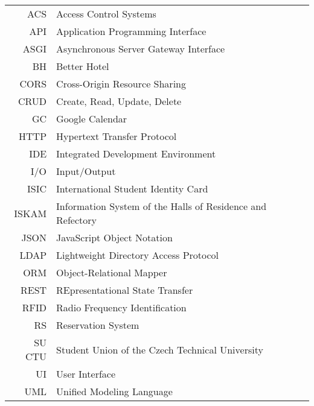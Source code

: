 \documentclass[english,bachelor,unicode,oneside]{ctufit-thesis}
\begin{document}
\begin{tabular}{rl}
    ACS & Access Control Systems\\
    API & Application Programming Interface\\
    ASGI & Asynchronous Server Gateway Interface\\
    BH & Better Hotel\\
    CORS & Cross-Origin Resource Sharing\\
    CRUD & Create, Read, Update, Delete\\
    GC & Google Calendar\\
    HTTP & Hypertext Transfer Protocol\\
    IDE & Integrated Development Environment\\
    I/O & Input/Output\\
    ISIC & International Student Identity Card\\
    ISKAM & Information System of the Halls of Residence and Refectory\\
    JSON & JavaScript Object Notation\\
    LDAP & Lightweight Directory Access Protocol\\
    ORM & Object-Relational Mapper\\
    REST & REpresentational State Transfer\\
    RFID & Radio Frequency Identification\\
    RS & Reservation System\\
    SU CTU & Student Union of the Czech Technical University\\
    UI & User Interface\\
    UML & Unified Modeling Language\\
\end{tabular}
\resumeTOCentries
\mainmatter\mainmatterinit %


\appendix\appendixinit %

\backmatter %

\printbibliography %

\end{document}
